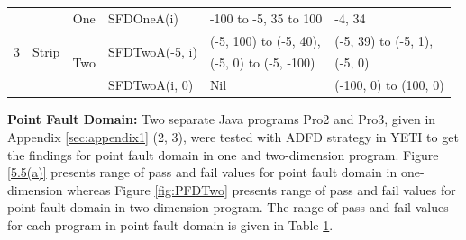 \begin{table}[h]
{\begin{tabular}{|c|c|c|l|l|l|}
\multirow{5}{*}{3} 	&	\multirow{5}{*}{Strip}					& 	\multirow{2}{*}{One}			&	\multirow{2}{*}{SFDOneA(i)}	&	\multirow{2}{*}{-100 to -5, 35 to 100}		& 	\multirow{2}{*}{-4, 34	}\\ 
				&									&							&							&									&				\\  \cline{3-6}
				&									&	\multirow{3}{*}{Two}			&	\multirow{2}{*}{SFDTwoA(-5, i)}	&	(-5, 100) to (-5, 40),					&  (-5, 39) to (-5, 1), 			\\ 
				&									&							&							&	 (-5, 0) to (-5, -100)					&	(-5, 0)				\\ \cline{4-6}
				&									& 							&	SFDTwoA(i, 0)				&	Nil								&  (-100, 0) to (100, 0)			\\  \hline
				
				
\end{tabular}
}
\label{table:failtable}
\end{table}




\noindent \textbf{Point Fault Domain:}  Two separate Java programs Pro2 and Pro3, given in Appendix \ref{sec:appendix1} (2, 3), were tested with ADFD strategy in YETI to get the findings for point fault domain in one and two-dimension program. Figure \ref{5.5(a)} presents range of pass and fail values for point fault domain in one-dimension whereas Figure \ref{fig:PFDTwo} presents range of pass and fail values for point fault domain in two-dimension program. The range of pass and fail values for each program in point fault domain is given in Table \ref{table:failtable}.

